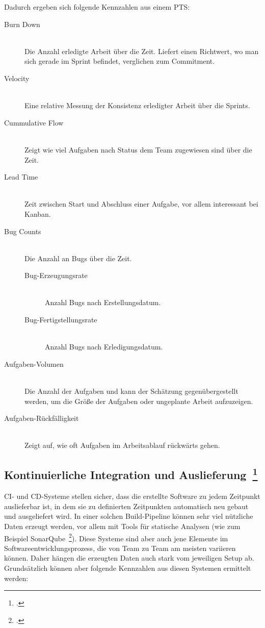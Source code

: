 Dadurch ergeben sich folgende Kennzahlen aus einem \ac{PTS}:
\begin{description}
  \item[Burn Down] \hfill \\ Die Anzahl erledigte Arbeit über die Zeit. Liefert einen Richtwert, wo man sich gerade im Sprint befindet, verglichen zum Commitment.
  \item[Velocity] \hfill \\ Eine relative Messung der Konsistenz erledigter Arbeit über die Sprints.
  \item[Cummulative Flow] \hfill \\ Zeigt wie viel Aufgaben nach Status dem Team zugewiesen sind über die Zeit.
  \item[Lead Time] \hfill \\ Zeit zwischen Start und Abschluss einer Aufgabe, vor allem interessant bei Kanban.
  \item[Bug Counts] \hfill \\ Die Anzahl an Bugs über die Zeit.
  \begin{description}
    \item[Bug-Erzeugungsrate] \hfill \\ Anzahl Bugs nach Erstellungsdatum.
    \item[Bug-Fertigstellungsrate] \hfill \\ Anzahl Bugs nach Erledigungsdatum.
  \end{description}
  \item[Aufgaben-Volumen] \hfill \\ Die Anzahl der Aufgaben und kann der Schätzung gegenübergestellt werden, um die Größe der Aufgaben oder ungeplante Arbeit aufzuzeigen.
  \item[Aufgaben-Rückfälligkeit] \hfill \\ Zeigt auf, wie oft Aufgaben im Arbeitsablauf rückwärts gehen.
\end{description}

\subsection[Kontinuierliche Integration und Auslieferung]{Kontinuierliche Integration und Auslieferung~\footcite[vgl.][S.84ff]{davis_agile_2015}}

\ac{CI}- und \ac{CD}-Systeme stellen sicher, dass die erstellte Software zu jedem Zeitpunkt auslieferbar ist, in dem sie zu definierten Zeitpunkten automatisch neu gebaut und ausgeliefert wird.
In einer solchen Build-Pipeline können sehr viel nützliche Daten erzeugt werden, vor allem mit Tools für statische Analysen (wie zum Beispiel SonarQube~\footcite[][]{sonarqube}).
Diese Systeme sind aber auch jene Elemente im Softwareentwicklungsprozess, die von Team zu Team am meisten variieren können.
Daher hängen die erzeugten Daten auch stark vom jeweiligen Setup ab.
Grundsätzlich können aber folgende Kennzahlen aus diesen Systemen ermittelt werden:

